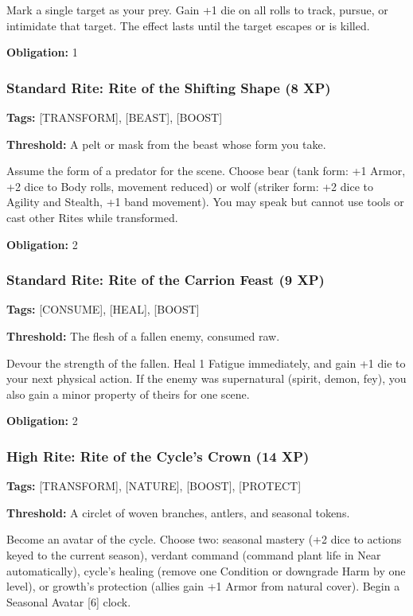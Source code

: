 Mark a single target as your prey. Gain +1 die on all rolls to track, pursue, or intimidate that target. The effect lasts until the target escapes or is killed.

\textbf{Obligation:} 1

\subsubsection{Standard Rite: Rite of the Shifting Shape (8 XP)}

\textbf{Tags:} [TRANSFORM], [BEAST], [BOOST]

\textbf{Threshold:} A pelt or mask from the beast whose form you take.

Assume the form of a predator for the scene. Choose bear (tank form: +1 Armor, +2 dice to Body rolls, movement reduced) or wolf (striker form: +2 dice to Agility and Stealth, +1 band movement). You may speak but cannot use tools or cast other Rites while transformed.

\textbf{Obligation:} 2

\subsubsection{Standard Rite: Rite of the Carrion Feast (9 XP)}

\textbf{Tags:} [CONSUME], [HEAL], [BOOST]

\textbf{Threshold:} The flesh of a fallen enemy, consumed raw.

Devour the strength of the fallen. Heal 1 Fatigue immediately, and gain +1 die to your next physical action. If the enemy was supernatural (spirit, demon, fey), you also gain a minor property of theirs for one scene.

\textbf{Obligation:} 2

\subsubsection{High Rite: Rite of the Cycle's Crown (14 XP)}

\textbf{Tags:} [TRANSFORM], [NATURE], [BOOST], [PROTECT]

\textbf{Threshold:} A circlet of woven branches, antlers, and seasonal tokens.

Become an avatar of the cycle. Choose two: seasonal mastery (+2 dice to actions keyed to the current season), verdant command (command plant life in Near automatically), cycle's healing (remove one Condition or downgrade Harm by one level), or growth's protection (allies gain +1 Armor from natural cover). Begin a Seasonal Avatar [6] clock.

